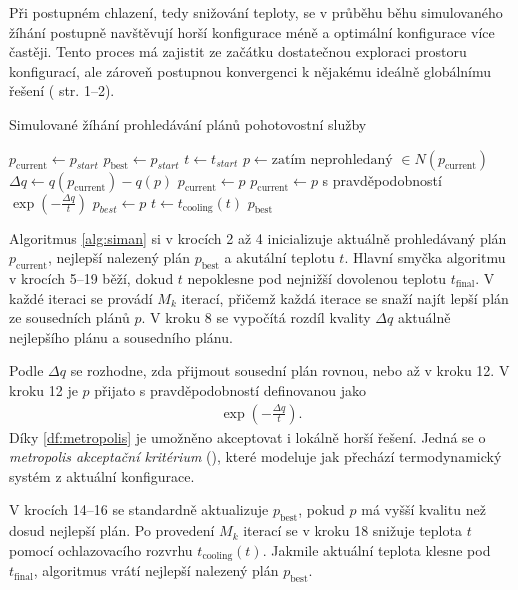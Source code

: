 Při postupném chlazení, tedy snižování teploty, se v průběhu běhu simulovaného žíhání postupně navštěvují horší konfigurace méně a optimální konfigurace více častěji.
Tento proces má zajistit ze začátku dostatečnou exploraci prostoru konfigurací, ale zároveň postupnou konvergenci k nějakému ideálně globálnímu řešení (\cite{GlovKoch03} str. 1--2).

\begin{algorithm}[H]
  \caption{Simulované žíhání prohledávání plánů pohotovostní služby}
  \begin{algorithmic}[1]
    \State $p_{\text{current}} \gets p_{start}$
    \State $p_{\text{best}} \gets p_{start}$
    \State $t \gets t_{start}$
        \State $p \gets \text{zatím neprohledaný } \in N(p_{\text{current}})$
        \State $\Delta q \gets q(p_{\text{current}}) - q(p)$
          \State $p_{\text{current}} \gets p$
        \Else
          \State $p_{\text{current}} \gets p$ s pravděpodobností $\exp\left(-\frac{\Delta q}{t}\right)$
        \EndIf
          \State $p_{best} \gets p$
        \EndIf
      \EndFor
      \State $t \gets t_{\text{cooling}}(t)$
    \EndWhile
    \State \Return $p_{\text{best}}$
    \EndFunction
  \end{algorithmic}
  \label{alg:siman}
\end{algorithm}

Algoritmus \ref{alg:siman} si v krocích 2 až 4 inicializuje aktuálně prohledávaný plán $p_{\text{current}}$, nejlepší nalezený plán $p_{\text{best}}$ a akutální teplotu $t$.
Hlavní smyčka algoritmu v krocích 5--19 běží, dokud $t$ nepoklesne pod nejnižší dovolenou teplotu $t_{\text{final}}$.
V každé iteraci se provádí $M_k$ iterací, přičemž každá iterace se snaží najít lepší plán ze sousedních plánů $p$.
V kroku 8 se vypočítá rozdíl kvality $\Delta q$ aktuálně nejlepšího plánu a sousedního plánu.

Podle $\Delta q$ se rozhodne, zda přijmout sousední plán rovnou, nebo až v kroku 12.
V kroku 12 je $p$ přijato s pravděpodobností definovanou jako
\begin{align}\label{df:metropolis}
  \exp\left(-\frac{\Delta q}{t}\right).
\end{align}
Díky \ref{df:metropolis} je umožněno akceptovat i lokálně horší řešení. Jedná se o \textit{metropolis akceptační kritérium} (\citet{Metropolis}), které modeluje
jak přechází termodynamický systém z aktuální konfigurace.

V krocích 14--16 se standardně aktualizuje $p_{\text{best}}$, pokud $p$ má vyšší kvalitu než dosud nejlepší plán.
Po provedení $M_k$ iterací se v kroku 18 snižuje teplota $t$ pomocí ochlazovacího rozvrhu $t_{\text{cooling}}(t)$.
Jakmile aktuální teplota klesne pod $t_{\text{final}}$, algoritmus vrátí nejlepší nalezený plán $p_{\text{best}}$.

